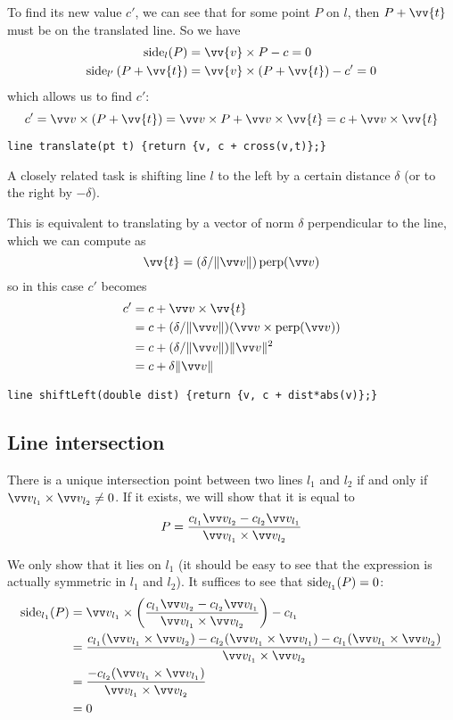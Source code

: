 
To find its new value $c'$, we can see that for some point $P$ on $l$, then $P+\vv{t}$ must be on the translated line. So we have
\begin{align*}
\side_l(P) &= \vv{v} \times P - c = 0\\
\side_{l'}\left(P + \vv{t}\right) &= \vv{v} \times \left(P + \vv{t}\right) - c' = 0
\end{align*}
which allows us to find $c'$:
\[c' = \dir \times (P+\vv{t}) = \dir\times P + \dir\times\vv{t} = c + \dir\times\vv{t}\]
\begin{lstlisting}
line translate(pt t) {return {v, c + cross(v,t)};}
\end{lstlisting}

A closely related task is shifting line $l$ to the left by a certain distance $\delta$ (or to the right by $-\delta$).


This is equivalent to translating by a vector of norm $\delta$ perpendicular to the line, which we can compute as
\[\vv{t} = (\delta/\norm{\dir})\perpop(\dir)\]
so in this case $c'$ becomes
\begin{align*}
c' &= c + \dir\times\vv{t}\\
&= c + (\delta/\norm{\dir})(\dir\times\perpop(\dir))\\
&= c + (\delta/\norm{\dir})\norm{\dir}^2\\
&= c + \delta\norm{\dir}
\end{align*}

\begin{lstlisting}
line shiftLeft(double dist) {return {v, c + dist*abs(v)};}
\end{lstlisting}

\subsection{Line intersection}\label{line-line}
There is a unique intersection point between two lines $l_1$ and $l_2$ if and only if $\dirof{l_1} \times \dirof{l_2} \neq 0$. If it exists, we will show that it is equal to
\[P = \frac{c_{l_1}\dirof{l_2} - c_{l_2}\dirof{l_1}}{\dirof{l_1} \times \dirof{l_2}}\]


We only show that it lies on $l_1$ (it should be easy to see that the expression is actually symmetric in $l_1$ and $l_2$). It suffices to see that $\operatorname{side}_{l_1}(P) = 0$:
\begin{align*}
\side_{l_1}(P) &= \dirof{l_1} \times \left(\frac{c_{l_1}\dirof{l_2} - c_{l_2}\dirof{l_1}}{\dirof{l_1} \times \dirof{l_2}}\right)-c_{l_1} \\
&=\frac{c_{l_1}(\dirof{l_1}\times\dirof{l_2}) - c_{l_2}(\dirof{l_1}\times\dirof{l_1}) - c_{l_1}(\dirof{l_1}\times\dirof{l_2})}{\dirof{l_1} \times \dirof{l_2}} \\
&=\frac{-c_{l_2}(\dirof{l_1}\times\dirof{l_1})}{\dirof{l_1} \times \dirof{l_2}} \\
&=0
\end{align*}

